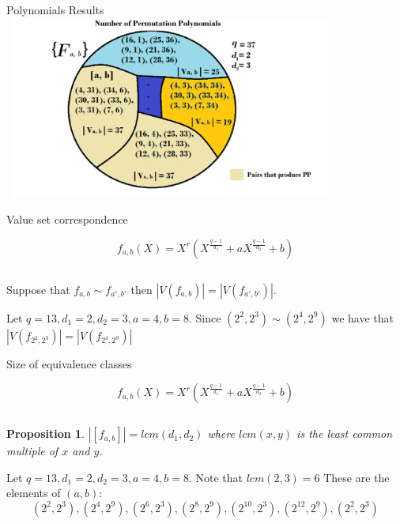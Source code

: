 \documentclass{beamer}
\newtheorem{proposition}{Proposition}
\begin{document}
\begin{frame}{Polynomials Results}
  \includegraphics[width=11cm, height=6cm]{clases1}
\end{frame}

\begin{frame}{Value set correspondence}

  {\Large $$f_{a,b}(X) = X^r(X^{\frac{q-1}{d_1}} + aX^{\frac{q-1}{d_2}} +b)$$}

  $$$$

  \begin{theorem}

    Suppose that $f_{a, b} \sim f_{a',b'}$ then $|V(f_{a, b})| = |V(f_{a', b'})|$.

  \end{theorem}

  \begin{example}
    Let $q = 13, d_1 = 2, d_2 = 3, a = 4, b = 8$. Since $(2^2,2^3) \sim (2^4,2^9)$ we have that $|V(f_{2^2, 2^3})| = |V(f_{2^4, 2^9})|$
  \end{example}

\end{frame}

\begin{frame}{Size of equivalence classes}
  
  {\Large $$f_{a,b}(X) = X^r(X^{\frac{q-1}{d_1}} + aX^{\frac{q-1}{d_2}} +b)$$}

  $$$$

  \begin{proposition}
    $|[f_{a, b}]| = lcm(d_1,d_2)$ where $lcm(x,y)$ is the least common multiple of $x$ and $y$.
  \end{proposition}

  \begin{example}
    Let $q = 13, d_1 = 2, d_2 = 3, a = 4, b = 8$. Note that $lcm(2,3) = 6$ These are the elements of $(a,b)$:
    $$ (2^2, 2^3), (2^4, 2^9), (2^6, 2^3), (2^8, 2^9), (2^10, 2^3), (2^{12}, 2^9), (2^2, 2^3) $$
  \end{example}
\end{frame}
\end{document}
